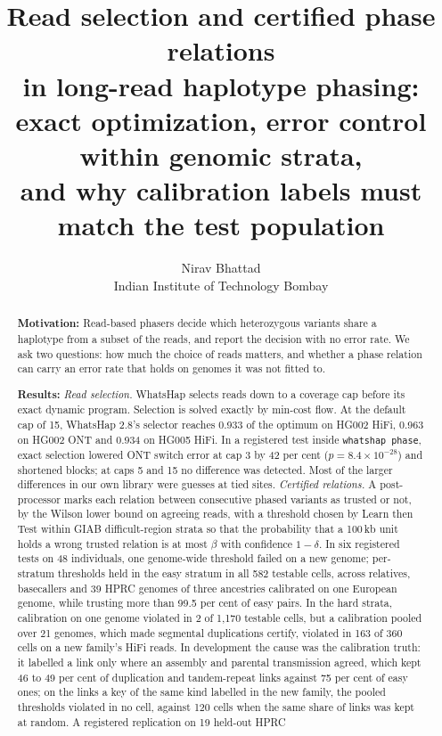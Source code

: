 \documentclass[11pt]{article}
\title{Read selection and certified phase relations\\
in long-read haplotype phasing:\\
exact optimization, error control within genomic strata,\\
and why calibration labels must match the test population}
\author{Nirav Bhattad\\Indian Institute of Technology Bombay}
\date{}
\theoremstyle{definition}
\theoremstyle{remark}
\begin{document}
\maketitle

\begin{abstract}
\noindent\textbf{Motivation:} Read-based phasers decide which heterozygous
variants share a haplotype from a subset of the reads, and report the
decision with no error rate. We ask two questions: how much the choice of
reads matters, and whether a phase relation can carry an error rate that
holds on genomes it was not fitted to.

\noindent\textbf{Results:} \emph{Read selection.} WhatsHap selects reads down
to a coverage cap before its exact dynamic program. Selection is solved
exactly by min-cost flow. At the default cap of 15, WhatsHap 2.8's selector
reaches 0.933 of the optimum on HG002 HiFi, 0.963 on HG002 ONT and 0.934 on
HG005 HiFi. In a registered test inside \texttt{whatshap phase}, exact
selection lowered ONT switch error at cap 3 by 42 per cent
($p=8.4\times10^{-28}$) and shortened blocks; at caps 5 and 15 no difference
was detected. Most of the larger differences in our own library were
guesses at tied sites. \emph{Certified relations.} A post-processor marks
each relation between consecutive phased variants as trusted or not, by the
Wilson lower bound on agreeing reads, with a threshold chosen by Learn then
Test within GIAB difficult-region strata so that the probability that a
100\,kb unit holds a wrong trusted relation is at most $\beta$ with
confidence $1-\delta$. In six registered tests on 48 individuals, one
genome-wide threshold failed on a new genome; per-stratum thresholds held in
the easy stratum in all 582 testable cells, across relatives, basecallers and
39 HPRC genomes of three ancestries calibrated on one European genome, while
trusting more than 99.5 per cent of easy pairs. In the hard strata,
calibration on one genome violated in 2 of 1{,}170 testable cells, but a
calibration pooled over 21 genomes, which made segmental duplications
certify, violated in 163 of 360 cells on a new family's HiFi reads. In
development the cause was the calibration truth: it labelled a link only
where an assembly and parental transmission agreed, which kept 46 to 49 per
cent of duplication and tandem-repeat links against 75 per cent of easy
ones; on the links a key of the same kind labelled in the new family, the
pooled thresholds violated in no cell, against 120 cells when the same share
of links was kept at random. A registered replication on 19 held-out HPRC

\end{abstract}
\end{document}

